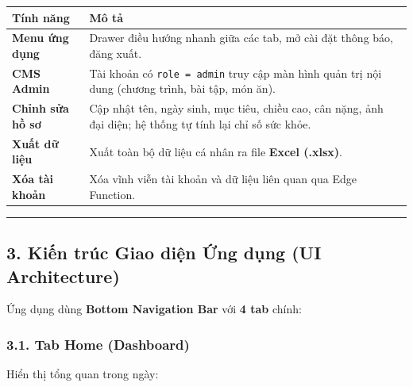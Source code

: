 \documentclass[12pt,a4paper]{article}
\newcounter{none}
\begin{document}
{\def\LTcaptype{none} %
\begin{longtable}[]{@{}
  >{\raggedright\arraybackslash}p{}
  >{\raggedright\arraybackslash}p{}@{}}
\toprule\noalign{}
\begin{minipage}[b]{\linewidth}\raggedright
Tính năng
\end{minipage} & \begin{minipage}[b]{\linewidth}\raggedright
Mô tả
\end{minipage} \\
\midrule\noalign{}
\endhead
\bottomrule\noalign{}
\endlastfoot
\textbf{Menu ứng dụng} & Drawer điều hướng nhanh giữa các tab, mở cài
đặt thông báo, đăng xuất. \\
\textbf{CMS Admin} & Tài khoản có \texttt{role\ =\ admin} truy cập màn
hình quản trị nội dung (chương trình, bài tập, món ăn). \\
\textbf{Chỉnh sửa hồ sơ} & Cập nhật tên, ngày sinh, mục tiêu, chiều cao,
cân nặng, ảnh đại diện; hệ thống tự tính lại chỉ số sức khỏe. \\
\textbf{Xuất dữ liệu} & Xuất toàn bộ dữ liệu cá nhân ra file
\textbf{Excel (.xlsx)}. \\
\textbf{Xóa tài khoản} & Xóa vĩnh viễn tài khoản và dữ liệu liên quan
qua Edge Function. \\
\end{longtable}
}

\begin{center}\rule{0.5\linewidth}{0.5pt}\end{center}

\subsection{3. Kiến trúc Giao diện Ứng dụng (UI
Architecture)}\label{kiux1ebfn-truxfac-giao-diux1ec7n-ux1ee9ng-dux1ee5ng-ui-architecture}

Ứng dụng dùng \textbf{Bottom Navigation Bar} với \textbf{4 tab} chính:

\subsubsection{3.1. Tab Home (Dashboard)}\label{tab-home-dashboard}

Hiển thị tổng quan trong ngày:
\end{document}
